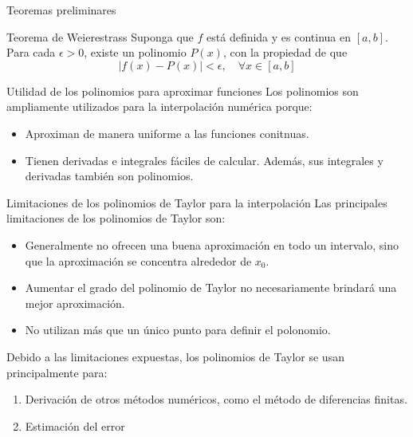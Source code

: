 \begin{frame}{Teoremas preliminares}
\begin{block}{Teorema de Weierestrass}
Suponga que $f$ está definida y es continua en $[a, b]$. Para cada $\epsilon>0$, existe un polinomio $P(x)$, con la propiedad de que 
$$|f(x)-P(x)|<\epsilon, \quad \forall x \in [a, b]$$
\end{block}
\end{frame}

\begin{frame}{Utilidad de los polinomios para aproximar funciones}
Los polinomios son ampliamente utilizados para la interpolación numérica porque:
\begin{itemize}
\item Aproximan de manera uniforme a las funciones conitnuas. 
\item Tienen derivadas e integrales fáciles de calcular. Además, sus integrales y derivadas también son polinomios. 
\end{itemize}
\end{frame}

\begin{frame}{Limitaciones de los polinomios de Taylor para la interpolación}
Las principales limitaciones de los polinomios de Taylor son:
\begin{itemize}
\item Generalmente no ofrecen una buena aproximación en todo un intervalo, sino que la aproximación se concentra alrededor de $x_0$.
\item Aumentar el grado del polinomio de Taylor no necesariamente brindará una mejor aproximación.   
\item No utilizan más que un único punto para definir el polonomio.  
\end{itemize}

Debido a las limitaciones expuestas, los polinomios de Taylor se usan principalmente para:
\begin{enumerate}
\item Derivación de otros métodos numéricos, como el método de diferencias finitas.
\item Estimación del error
\end{enumerate}
\end{frame}

